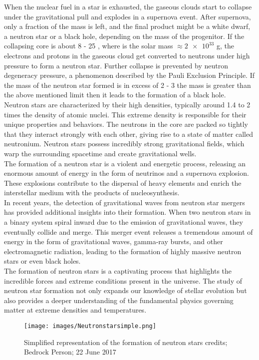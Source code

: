 
When the nuclear fuel in a star is exhausted, the gaseous clouds start to collapse under the gravitational pull and explodes in a supernova event. After supernova, only a fraction of the mass is left, and the final product might be a white dwarf, a neutron star or a black hole, depending on the mass of the progenitor. If the collapsing core is about 8 - 25 \mdot, where \mdot is the solar mass $\approx \num{2e33}$ g, the electrons and protons in the gaseous cloud get converted to neutrons under high pressure to form a neutron star. Further collapse is prevented by neutron degeneracy pressure, a phenomenon described by the Pauli Exclusion Principle. If the mass of the neutron star formed is in excess of 2 - 3 \mdot the mass is greater than the above mentioned limit then it leads to the formation of a black hole.\\

Neutron stars are characterized by their high densities, typically around 1.4 to 2 times the density of atomic nuclei. This extreme density is responsible for their unique properties and behaviors. The neutrons in the core are packed so tightly that they interact strongly with each other, giving rise to a state of matter called neutronium. Neutron stars possess incredibly strong gravitational fields, which warp the surrounding spacetime and create gravitational wells.\\

The formation of a neutron star is a violent and energetic process, releasing an enormous amount of energy in the form of neutrinos and a supernova explosion. These explosions contribute to the dispersal of heavy elements and enrich the interstellar medium with the products of nucleosynthesis.\\

In recent years, the detection of gravitational waves from neutron star mergers has provided additional insights into their formation. When two neutron stars in a binary system spiral inward due to the emission of gravitational waves, they eventually collide and merge. This merger event releases a tremendous amount of energy in the form of gravitational waves, gamma-ray bursts, and other electromagnetic radiation, leading to the formation of highly massive neutron stars or even black holes.\\

The formation of neutron stars is a captivating process that highlights the incredible forces and extreme conditions present in the universe. The study of neutron star formation not only expands our knowledge of stellar evolution but also provides a deeper understanding of the fundamental physics governing matter at extreme densities and temperatures.\\

\begin{figure}[h]
\centering
\texttt{[image: images/Neutronstarsimple.png]}
\caption{\small Simplified representation of the formation of neutron stars credits; Bedrock Person; 22 June 2017}
\end{figure}